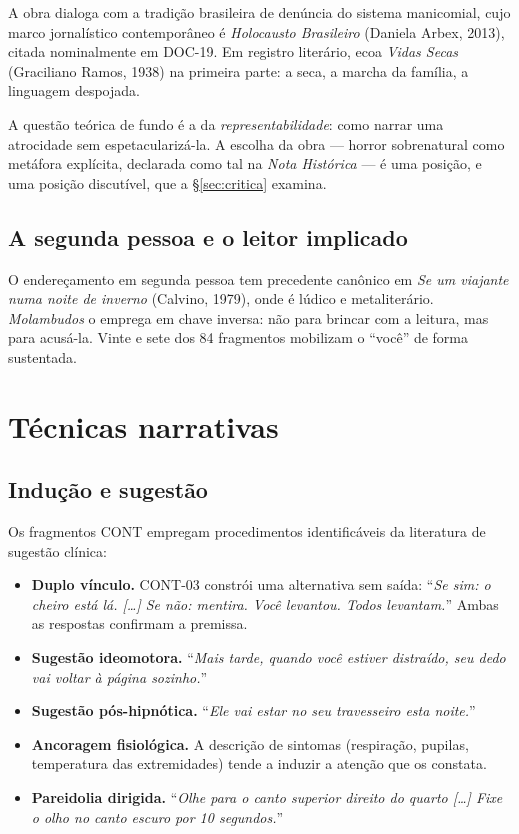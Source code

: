 \documentclass[11pt,a4paper]{article}
\begin{document}
A obra dialoga com a tradição brasileira de denúncia do sistema manicomial,
cujo marco jornalístico contemporâneo é \textit{Holocausto Brasileiro}
(Daniela Arbex, 2013), citada nominalmente em DOC-19. Em registro literário,
ecoa \textit{Vidas Secas} (Graciliano Ramos, 1938) na primeira parte: a seca,
a marcha da família, a linguagem despojada.

A questão teórica de fundo é a da \textit{representabilidade}: como narrar uma
atrocidade sem espetacularizá-la. A escolha da obra --- horror sobrenatural
como metáfora explícita, declarada como tal na \textit{Nota Histórica} --- é
uma posição, e uma posição discutível, que a \S\ref{sec:critica} examina.

\subsection{A segunda pessoa e o leitor implicado}

O endereçamento em segunda pessoa tem precedente canônico em \textit{Se um
viajante numa noite de inverno} (Calvino, 1979), onde é lúdico e
metaliterário. \textit{Molambudos} o emprega em chave inversa: não para
brincar com a leitura, mas para acusá-la. Vinte e sete dos 84 fragmentos
mobilizam o ``você'' de forma sustentada.

\section{Técnicas narrativas}

\subsection{Indução e sugestão}

Os fragmentos CONT empregam procedimentos identificáveis da literatura de
sugestão clínica:

\begin{itemize}
\item \textbf{Duplo vínculo.} CONT-03 constrói uma alternativa sem saída:
``\textit{Se sim: o cheiro está lá. [\ldots] Se não: mentira. Você levantou.
Todos levantam.}'' Ambas as respostas confirmam a premissa.

\item \textbf{Sugestão ideomotora.} ``\textit{Mais tarde, quando você estiver
distraído, seu dedo vai voltar à página sozinho.}''

\item \textbf{Sugestão pós-hipnótica.} ``\textit{Ele vai estar no seu
travesseiro esta noite.}''

\item \textbf{Ancoragem fisiológica.} A descrição de sintomas (respiração,
pupilas, temperatura das extremidades) tende a induzir a atenção que os
constata.

\item \textbf{Pareidolia dirigida.} ``\textit{Olhe para o canto superior
direito do quarto [\ldots] Fixe o olho no canto escuro por 10 segundos.}''
\end{itemize}
\end{document}
